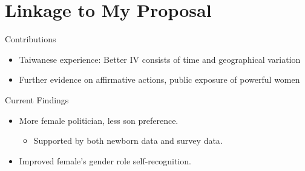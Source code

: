 \documentclass[
  10pt,
  ignorenonframetext,
  aspectratio=43,
]{beamer}
\providecommand{\tightlist}{%
  \setlength{\itemsep}{0pt}\setlength{\parskip}{0pt}}
\begin{document}
\hypertarget{linkage-to-my-proposal}{%
\section{Linkage to My Proposal}\label{linkage-to-my-proposal}}

\begin{frame}{Contributions}
\protect\hypertarget{contributions}{}
\begin{itemize}
\tightlist
\item
  Taiwanese experience: Better IV consists of time and geographical
  variation
\item
  Further evidence on affirmative actions, public exposure of powerful
  women
\end{itemize}
\end{frame}

\begin{frame}{Current Findings}
\protect\hypertarget{current-findings}{}
\begin{itemize}
\tightlist
\item
  More female politician, less son preference.

  \begin{itemize}
  \tightlist
  \item
    Supported by both newborn data and survey data.
  \end{itemize}
\item
  Improved female's gender role self-recognition.
\end{itemize}
\end{frame}
\end{document}
